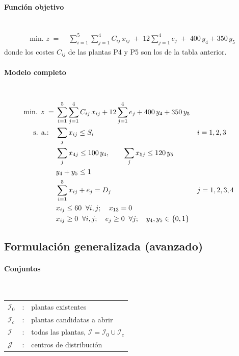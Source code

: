 \paragraph{Función objetivo}\mbox{}\\
\begin{align}
\mbox{min. } z \;=\;
& \sum_{i=1}^{5}\sum_{j=1}^{4} C_{ij}\, x_{ij} \;+\; 12 \sum_{j=1}^{4} e_j \;+\; 400\,y_4 + 350\,y_5
\end{align}
donde los costes $C_{ij}$ de las plantas P4 y P5 son los de la tabla anterior.

\paragraph{Modelo completo}\mbox{}\\
\begin{align}
\mbox{min. } z \;=\;& \sum_{i=1}^{5}\sum_{j=1}^{4} C_{ij}\, x_{ij} + 12 \sum_{j=1}^{4} e_j + 400\,y_4 + 350\,y_5 \notag\\
\mbox{s. a.:}\quad
& \sum_{j} x_{ij} \leq S_i && i=1,2,3 \notag\\
& \sum_{j} x_{4j} \leq 100\,y_4,\qquad \sum_{j} x_{5j} \leq 120\,y_5 \notag\\
& y_4 + y_5 \leq 1 \notag\\
& \sum_{i=1}^{5} x_{ij} + e_j = D_j && j=1,2,3,4 \notag\\
& x_{ij} \leq 60 \;\; \forall i,j; \quad x_{13}=0 \notag\\
& x_{ij} \geq 0 \;\; \forall i,j; \quad e_j \geq 0 \;\; \forall j; \quad y_4,y_5 \in \{0,1\} \notag
\end{align}

\subsection{Formulación generalizada (avanzado)}

\paragraph{Conjuntos}\mbox{}\\
\begin{tabular}{l c l}
    $\mathcal{I}_0$ & : & plantas existentes \\
    $\mathcal{I}_c$ & : & plantas candidatas a abrir \\
    $\mathcal{I}$   & : & todas las plantas, $\mathcal{I} = \mathcal{I}_0 \cup \mathcal{I}_c$ \\
    $\mathcal{J}$   & : & centros de distribución \\
\end{tabular}

